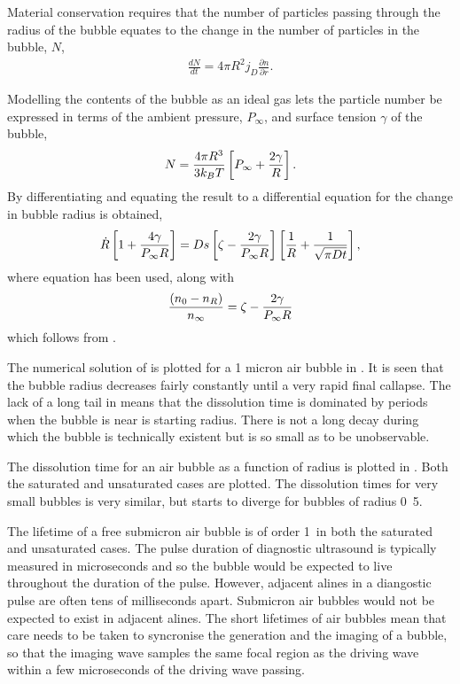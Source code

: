 Material conservation requires that the number of particles passing through the radius of the bubble
equates to the change in the number of particles in the bubble, $N$,
\begin{align}
  \frac{dN}{dt} =4 \pi R^2 j_D\frac{\partial n}{\partial r}.
\label{eqn:nuc:materialCons}
\end{align}

Modelling the contents of the bubble as an ideal gas lets the particle number be expressed in terms of the ambient pressure, $P_\infty$, and surface tension $\gamma$ of the bubble,
\begin{align}
  N = \frac{4\pi R^3 }{3k_B T} \left[ P_\infty + \frac{2\gamma}{R} \right].
  \label{eqn:nuc:ParticleNumber}
\end{align}
By differentiating  and equating the result to  a differential equation for the change in bubble radius is obtained,
\begin{align}
   \dot{R}\left[  1+ \frac{4\gamma}{P_\infty R} \right] = Ds\left[  \zeta - \frac{2\gamma}{P_\infty R} \right]\left[ \frac{1}{R} + \frac{1}{\sqrt{\pi D t}} \right],
   \label{eqn:nuc:Rdot}
\end{align}
where equation  has been used, along with
\begin{align}
  \frac{\left( n_0 - n_R \right)}{n_\infty} = \zeta - \frac{2\gamma}{P_\infty R}
  \label{eqn:nuc:dissolve}
\end{align}
which follows from .






The numerical solution of  is plotted for a 1 micron air bubble in .
It is seen that the bubble radius decreases fairly constantly until a very rapid final callapse.
The lack of a long tail in 
means that the dissolution time is dominated by periods when the bubble is near is starting radius.
There is not a long decay during which the bubble is technically existent but is so small as to be unobservable.

The dissolution time for an air bubble as a function of radius is plotted in .
Both the saturated and unsaturated cases are plotted.
The dissolution times for very small bubbles is very similar,
but starts to diverge for bubbles of radius \unit{0.5}\micro\metre.

The lifetime of a free submicron air bubble is of order \unit{1}\milli\second\ in both the  saturated and unsaturated cases.
The pulse duration of diagnostic ultrasound is typically measured in microseconds and so the bubble would be expected to live throughout the duration of the pulse.
However, adjacent alines in a diangostic pulse are often tens of milliseconds apart.
Submicron air bubbles would not be expected to exist in adjacent alines.
The short lifetimes of air bubbles mean that care needs to be taken to syncronise the generation and the imaging of a bubble,
so that the imaging wave samples the same focal region as the driving wave within a few microseconds of the driving wave passing.


